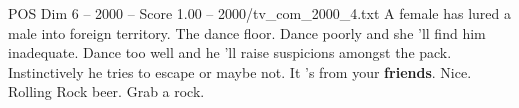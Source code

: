 \begin{textsample}{POS Dim 6 – 2000 – Score 1.00 – 2000/tv\_com\_2000\_4.txt}  \label{ex:f6_pos_084}
A female has lured a male into foreign territory.
The dance floor.
Dance poorly and she 'll find him inadequate.
Dance too well and he 'll raise suspicions amongst the pack.
Instinctively he tries to escape or maybe not.
It 's from your \textbf{friends}.
Nice.
Rolling Rock beer.
Grab a rock.

\end{textsample}

